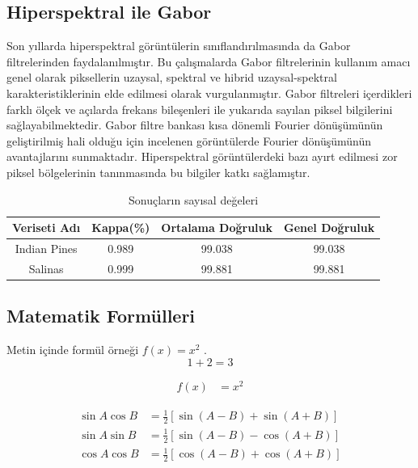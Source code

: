 \subsection{Hiperspektral ile Gabor}
Son yıllarda hiperspektral görüntülerin sınıflandırılmasında
da Gabor filtrelerinden faydalanılmıştır. Bu
çalışmalarda Gabor filtrelerinin kullanım amacı genel olarak
piksellerin uzaysal, spektral ve hibrid uzaysal-spektral
karakteristiklerinin elde edilmesi olarak vurgulanmıştır.
Gabor filtreleri içerdikleri farklı ölçek ve açılarda frekans
bileşenleri ile yukarıda sayılan piksel bilgilerini
sağlayabilmektedir. Gabor filtre bankası kısa dönemli
Fourier dönüşümünün geliştirilmiş hali olduğu için
incelenen görüntülerde Fourier dönüşümünün avantajlarını
sunmaktadır. Hiperspektral görüntülerdeki bazı ayırt
edilmesi zor piksel bölgelerinin tanınmasında bu bilgiler
katkı sağlamıştır.
\begin{table}[!ht]
\centering
    \begin{threeparttable} %
    \caption{Sonuçların sayısal değeleri}
        \begin{tabular}{|c|c|c|c|}
        \hline
        \textbf{Veriseti Adı} & \textbf{Kappa(\%)} & \textbf{Ortalama Doğruluk} & \textbf{Genel Doğruluk} \\ \hline
        Indian Pines & 0.989    & 99.038           & 99.038         \\ \hline
        Salinas & 0.999    & 99.881          & 99.881         \\ \hline
        \end{tabular}
    \end{threeparttable} %
\end{table}

\subsection{Matematik Formülleri}
Metin içinde formül örneği $f(x) = x^2$ .
\begin{equation}
  1 + 2 = 3 
\end{equation}

\begin{align}
  f(x) &= x^2
\end{align}

\begin{align}
          \sin A \cos B &= \frac{1}{2}\left[ \sin(A-B)+\sin(A+B) \right] \\
          \sin A \sin B &= \frac{1}{2}\left[ \sin(A-B)-\cos(A+B) \right] \\
          \cos A \cos B &= \frac{1}{2}\left[ \cos(A-B)+\cos(A+B) \right] 
\end{align}

